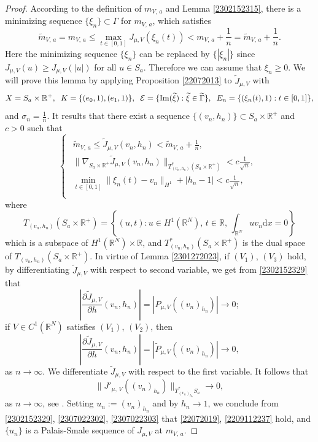 \documentclass[10pt]{article}
\numberwithin{equation}{section}
\newcommand{\ud}{\mathrm{d}}
\numberwithin{equation}{section}
\begin{document}
\begin{proof}
According to the definition of ${m}_{V,\, a}$ and Lemma \ref{2302152315}, there is a minimizing sequence $\{\xi_n\}\subset \Gamma$ for ${m}_{V,\, a}$, which satisfies
\[
\widetilde{m}_{V,\, a}={m}_{V,\, a}\le \underset{t\in [0,1]}{\max}J_{\mu, V}(\xi_n(t))< {m}_{V,\, a}+\frac1n=\widetilde{m}_{V,\, a}+\frac1n.
\]
Here the minimizing sequence $\{\xi_n\}$ can be replaced by $\{|\xi_n|\}$ since $J_{\mu, V}(u)\ge J_{\mu, V}(|u|)$ for all $u\in S_a$. Therefore we can assume that $\xi_n\ge 0$.
We will prove this lemma by applying Proposition \ref{22072013} to $\widetilde{J}_{\mu, V}$ with
\[
X=S_a\times \mathbb{R}^+,\;\; K=\{(e_0, 1), (e_1, 1)\},\;\; \mathcal{E}=\{{\rm Im}({\widetilde \xi}): {\widetilde \xi}\in\widetilde{\Gamma}\},\;\; E_n=\{(\xi_n(t), 1): t\in [0,1]\},
\]
and $\sigma_n=\frac1n$. It results that there exist a sequence $\{(v_n,h_n)\}\subset S_a\times \mathbb{R}^+$ and $c>0$ such that
\begin{equation}\label{2302152329}
\begin{cases}
\begin{aligned}
\widetilde{m}_{V,\, a}\le \widetilde{J}_{\mu, V}(v_n,h_n) <\widetilde{m}_{V,\, a}+\frac1n,\\
 \|\nabla_{S_a\times \mathbb{R}^+}\widetilde{J}_{\mu, V}(v_n,h_n)\|_{T^{*}_{(v_n,h_n)}(S_a\times \mathbb{R}^+)}<c\frac{1}{\sqrt{n}},\\
\underset{t\in [0,1]}{\min}\|\xi_n(t)-v_n\|_{H^1}+|h_n-1|<c\frac{1}{\sqrt{n}},\\
\end{aligned}
\end{cases}
\end{equation}
where
$$T_{(v_n,h_n)}(S_a\times \mathbb{R}^+)=\left\{(u,t):u\in H^1(\mathbb{R}^N),\, t\in \mathbb{R},\,  \int_{\mathbb{R}^N}uv_n \ud x=0\right\}$$
which is a subspace of $H^1(\mathbb{R}^N)\times \mathbb{R}$, and $T^{*}_{(v_n,h_n)}(S_a\times \mathbb{R}^+)$ is the dual space of $T_{(v_n,h_n)}(S_a\times \mathbb{R}^+)$. In virtue of Lemma \ref{2301272023}, if $(V_1)$, $(V_3)$ hold, by differentiating $\widetilde{J}_{\mu, V}$ with respect to second variable, we get from \eqref{2302152329} that
\begin{equation}\label{2307022302}
\left|\frac{\partial \widetilde{J}_{\mu, V}}{\partial h}(v_n,h_n)\right|=|{P}_{\mu, V}((v_n)_{h_n})|\to 0;
\end{equation}
if $V\in C^1(\mathbb{R}^N)$ satisfies $(V_1)$, $(V_2)$, then
\begin{equation}\label{2307022303}
\left|\frac{\partial \widetilde{J}_{\mu, V}}{\partial h}(v_n,h_n)\right|=|\widetilde{P}_{\mu, V}((v_n)_{h_n})|\to 0,
\end{equation}
as $n\to \infty$. We differentiate $\widetilde{J}_{\mu, V}$ with respect to the first variable. It follows that
\[
\|J'_{\mu,\, V}((v_n)_{h_n})\|_{T^*_{(v_n)_{h_n}}S_a}\to 0,
\]
as $n\to \infty$, see \cite{Jeanjean97}. Setting $u_n:=(v_n)_{h_n}$ and by $h_n\to 1$, we conclude from \eqref{2302152329}, \eqref{2307022302}, \eqref{2307022303} that \eqref{22072019}, \eqref{2209112237} hold, and $\{u_n\}$ is a Palais-Smale sequence of $J_{\mu, V}$ at ${m}_{V,\, a}$.
\end{proof}
\end{document}
